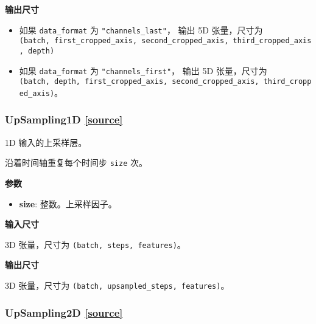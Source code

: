 \textbf{输出尺寸}

\begin{itemize}
\tightlist
\item
  如果 \texttt{data\_format} 为 \texttt{"channels\_last"}， 输出 5D
  张量，尺寸为
  \texttt{(batch,\ first\_cropped\_axis,\ second\_cropped\_axis,\ third\_cropped\_axis,\ depth)}
\item
  如果 \texttt{data\_format} 为 \texttt{"channels\_first"}， 输出 5D
  张量，尺寸为
  \texttt{(batch,\ depth,\ first\_cropped\_axis,\ second\_cropped\_axis,\ third\_cropped\_axis)}。
\end{itemize}



\subsubsection{UpSampling1D {\href{https://github.com/keras-team/keras/blob/master/keras/layers/convolutional.py\#L1514}{{[}source{]}}}}

\begin{Shaded}
\begin{Highlighting}[]
\OperatorTok{=}\NormalTok{)}
\end{Highlighting}
\end{Shaded}

1D 输入的上采样层。

沿着时间轴重复每个时间步 \texttt{size} 次。

\textbf{参数}

\begin{itemize}
\tightlist
\item
  \textbf{size}: 整数。上采样因子。
\end{itemize}

\textbf{输入尺寸}

3D 张量，尺寸为 \texttt{(batch,\ steps,\ features)}。

\textbf{输出尺寸}

3D 张量，尺寸为 \texttt{(batch,\ upsampled\_steps,\ features)}。




\subsubsection{UpSampling2D {\href{https://github.com/keras-team/keras/blob/master/keras/layers/convolutional.py\#L1549}{{[}source{]}}}}

\begin{Shaded}
\begin{Highlighting}[]
\OperatorTok{=}\NormalTok{(}\NormalTok{, }\OperatorTok{=}\NormalTok{)}
\end{Highlighting}
\end{Shaded}

